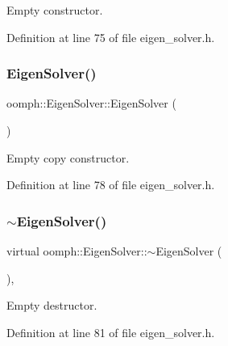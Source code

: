 Empty constructor. 



Definition at line 75 of file eigen\+\_\+solver.\+h.

\mbox{\label{classoomph_1_1EigenSolver_a2ab3e3ffc0a171dd5299d12d8be5d1b2}} 
\subsubsection{\texorpdfstring{Eigen\+Solver()}{EigenSolver()}\hspace{0.1cm}{\footnotesize\ttfamily [2/2]}}
{\footnotesize\ttfamily oomph\+::\+Eigen\+Solver\+::\+Eigen\+Solver (\begin{DoxyParamCaption}\item[{const \hyperlink{classoomph_1_1EigenSolver}{Eigen\+Solver} \&}]{ }\end{DoxyParamCaption})\hspace{0.3cm}{\ttfamily [inline]}}



Empty copy constructor. 



Definition at line 78 of file eigen\+\_\+solver.\+h.

\mbox{\label{classoomph_1_1EigenSolver_a05742af42f53f3904b06c7650e3c10c5}} 
\subsubsection{\texorpdfstring{$\sim$\+Eigen\+Solver()}{~EigenSolver()}}
{\footnotesize\ttfamily virtual oomph\+::\+Eigen\+Solver\+::$\sim$\+Eigen\+Solver (\begin{DoxyParamCaption}{ }\end{DoxyParamCaption})\hspace{0.3cm}{\ttfamily [inline]}, {\ttfamily [virtual]}}



Empty destructor. 



Definition at line 81 of file eigen\+\_\+solver.\+h.



